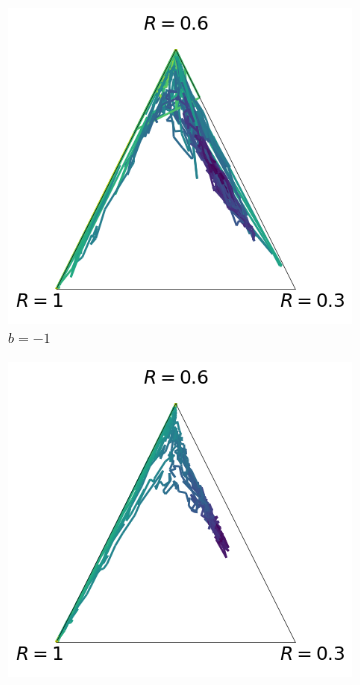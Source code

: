 \begin{figure}[!ht]
\centering
  \begin{subfigure}[b]{0.32\linewidth}
    \includegraphics[width=\textwidth]{articles/baselines/figs/baseline_4rooms/4rooms_1.png}
    \caption{$b=-1$}
    \label{fig:4rooms_m1}
  \end{subfigure}
    \begin{subfigure}[b]{0.32\linewidth}
    \includegraphics[width=\textwidth]{articles/baselines/figs/baseline_4rooms/4rooms_2.png}

\end{subfigure}
\end{figure}

